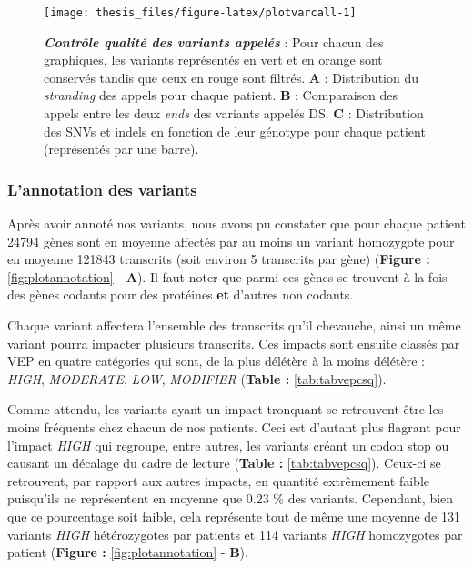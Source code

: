 \documentclass[12pt,a4paper,twoside]{ugathesis}
\begin{document}
\newpage

\begin{figure}

{\centering \texttt{[image: thesis\_files/figure-latex/plotvarcall-1]} 

}

\caption[Contrôle qualité des variants appelés]{\textbf{\emph{Contrôle qualité des variants appelés}}
: Pour chacun des graphiques, les variants représentés en vert et en
orange sont conservés tandis que ceux en rouge sont filtrés. \textbf{A}
: Distribution du \emph{stranding} des appels pour chaque patient.
\textbf{B} : Comparaison des appels entre les deux \emph{ends} des
variants appelés DS. \textbf{C} : Distribution des SNVs et indels en
fonction de leur génotype pour chaque patient (représentés par une
barre).}\label{fig:plotvarcall}
\end{figure}










\newpage

\subsubsection{L'annotation des
variants}\label{lannotation-des-variants-1}

Après avoir annoté nos variants, nous avons pu constater que pour chaque
patient 24794 gènes sont en moyenne affectés par au moins un variant
homozygote pour en moyenne 121843 transcrits (soit environ 5 transcrits
par gène) (\textbf{Figure : }\ref{fig:plotannotation} - \textbf{A}). Il
faut noter que parmi ces gènes se trouvent à la fois des gènes codants
pour des protéines \textbf{et} d'autres non codants.

Chaque variant affectera l'ensemble des transcrits qu'il chevauche,
ainsi un même variant pourra impacter plusieurs transcrits. Ces impacts
sont ensuite classés par VEP en quatre catégories qui sont, de la plus
délétère à la moins délétère : \emph{HIGH}, \emph{MODERATE}, \emph{LOW},
\emph{MODIFIER} (\textbf{Table : }\ref{tab:tabvepcsq}).

Comme attendu, les variants ayant un impact tronquant se retrouvent être
les moins fréquents chez chacun de nos patients. Ceci est d'autant plus
flagrant pour l'impact \emph{HIGH} qui regroupe, entre autres, les
variants créant un codon stop ou causant un décalage du cadre de lecture
(\textbf{Table : }\ref{tab:tabvepcsq}). Ceux-ci se retrouvent, par
rapport aux autres impacts, en quantité extrêmement faible puisqu'ils ne
représentent en moyenne que 0.23 \% des variants. Cependant, bien que ce
pourcentage soit faible, cela représente tout de même une moyenne de 131
variants \emph{HIGH} hétérozygotes par patients et 114 variants
\emph{HIGH} homozygotes par patient (\textbf{Figure :
}\ref{fig:plotannotation} - \textbf{B}).
\end{document}
